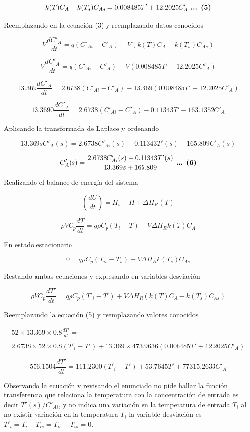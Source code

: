 \documentclass[
  letterpaper,
  DIV=11,
  numbers=noendperiod]{scrreprt}
\begin{document}
\[
k(T)C_A - k(T_s)C_{As} = 0.008485T'+12.2025C'_A \space\space\textbf{ ... (5)}
\]

Reemplazando en la ecuación (3) y reemplazando datos conocidos

\[
V\frac{dC'_A}{dt}=q(C'_{Ai}-C'_A)-V(k(T)C_A-k(T_s)C_{As})
\]

\[
V\frac{dC'_A}{dt}=q(C'_{Ai}-C'_A)-V(0.008485T'+12.2025C'_A)
\]

\[
13.369\frac{dC'_A}{dt}=2.6738(C'_{Ai}-C'_A)-13.369(0.008485T'+12.2025C'_A)
\]

\[
13.3690\frac{dC'_{A}}{dt}=2.6738(C'_{Ai}-C'_A)-0.11343 T'-163.1352C'_A
\]

Aplicando la transformada de Laplace y ordenando

\[
13.369sC'_A(s)=2.6738C'_{Ai}(s)-0.11343T'(s)-165.809C'_A(s)
\]

\[
C'_A(s) = \frac{2.6738C'_{Ai}(s)-0.11343T'(s)}{13.369s+165.809}\space\space\textbf{ ... (6)}
\]

Realizando el balance de energía del sistema

\[
\left(\frac{dU}{dt}\right)=H_i-H+\Delta H_R(T)
\]

\[
\rho V C_p \frac{dT}{dt}=q\rho C_p(T_i-T)+V\Delta H_Rk(T)C_A
\]

En estado estacionario

\[
0=q\rho C_p(T_{is}-T_s)+V\Delta H_Rk(T_s)C_{As}
\]

Restando ambas ecuaciones y expresando en variables desviación

\[
\rho V C_p \frac{dT'}{dt}=q\rho C_p(T'_i-T')+V\Delta H_R(k(T)C_A - k(T_s)C_{As})
\]

Reemplazando la ecuación (5) y reemplazando valores conocidos

\[
\begin{array}{l}
52 \times 13.369 \times 0.8 \frac{dT'}{dt}=\\ \\
2.6738\times 52\times 0.8(T'_i-T')+13.369\times 473.9636(0.008485T'+12.2025C'_A)
\end{array}
\]

\[
556.1504\frac{dT'}{dt}=111.2300(T'_i-T')+53.7645T'+77315.2633C'_A
\]

Observando la ecuación y revisando el enunciado no pide hallar la
función transferencia que relaciona la temperatura con la concentración
de entrada es decir \(T'(s)/C'_{Ai}\), y no indica una variación en la
temperatura de entrada \(T_i\) al no existir variación en la temperatura
\(T_i\) la variable desviación es \(T'_i = T_i-T_{is}=T_{is}-T_{is}=0\).
\end{document}
